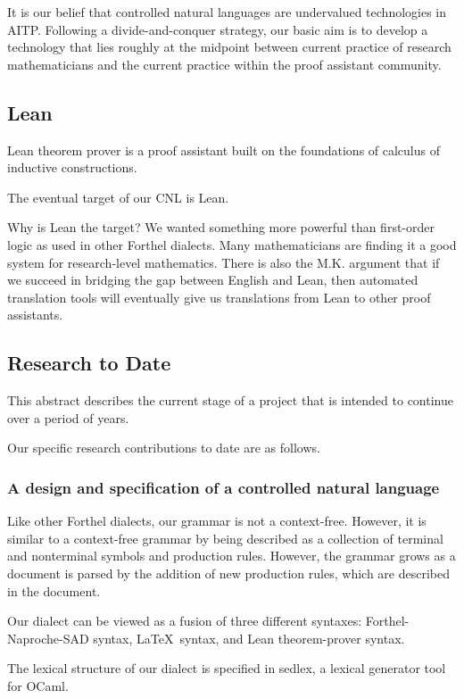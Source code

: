\documentclass[12pt]{amsart}
\renewcommand{\~}{\ }
\renewcommand{\_}{\textunderscore}
\begin{document}
It is our belief that controlled natural languages are undervalued
technologies in AITP.  Following a divide-and-conquer strategy, our
basic aim is to develop a technology that lies roughly at the midpoint
between current practice of research mathematicians and the current
practice within the proof assistant community.  

\subsection{Lean}

Lean theorem prover is a proof assistant built on the
foundations of calculus of inductive constructions.

The eventual target of our CNL is Lean.

Why is Lean the target?  We wanted something more powerful than 
first-order logic as used in other Forthel dialects.
Many mathematicians are finding it a good system
for research-level mathematics.  There is also the M.K. argument
that if we succeed in bridging the gap between English and Lean,
then automated translation tools will eventually give us translations
from Lean to other proof assistants.


\subsection{Research to Date}

This abstract describes the current stage of a project that is
intended to continue over a period of years.

Our specific research contributions to date are as follows.

\subsubsection{A design and specification of a controlled natural
  language}

Like other Forthel dialects, our grammar is not a context-free.
However, it is similar to a context-free grammar by being described as
a collection of terminal and nonterminal symbols and production rules.
However, the grammar grows as a document is parsed by the addition of
new production rules, which are described in the document.

Our dialect can be viewed as a fusion of three different syntaxes:
Forthel-Naproche-SAD syntax, \LaTeX\ syntax, and Lean theorem-prover
syntax.  

The lexical structure of our dialect is specified in sedlex, a lexical
generator tool for OCaml.
\end{document}

